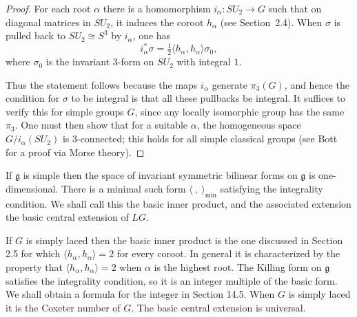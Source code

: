 \documentclass[12pt]{article}
\begin{document}
\begin{proof}
        For each root $\alpha$ there is a homomorphism $i_\alpha : SU_2 \to G$ such that on diagonal matrices in $SU_2$, it induces the coroot $h_\alpha$ (see Section~2.4). When $\sigma$ is pulled back to $SU_2 \cong S^3$ by $i_\alpha$, one has
        \[
            i_\alpha^*\sigma = \tfrac{1}{2}\langle h_\alpha, h_\alpha\rangle \sigma_0,
        \]
        where $\sigma_0$ is the invariant 3-form on $SU_2$ with integral $1$. 
        
        Thus the statement follows because the maps $i_\alpha$ generate $\pi_3(G)$, and hence the condition for $\sigma$ to be integral is that all these pullbacks be integral. It suffices to verify this for simple groups $G$, since any locally isomorphic group has the same $\pi_3$. One must then show that for a suitable $\alpha$, the homogeneous space $G/i_\alpha(SU_2)$ is 3-connected; this holds for all simple classical groups (see Bott~\cite{Bott-MorseTheory} for a proof via Morse theory).
    \end{proof}



    If $\mathfrak{g}$ is simple then the space of invariant symmetric bilinear forms on $\mathfrak{g}$ is one-dimensional. There is a minimal such form $\langle\ ,\ \rangle_{\mathrm{min}}$ satisfying the integrality condition. We shall call this the basic inner product, and the associated extension the basic central extension of $LG$. 

    If $G$ is simply laced then the basic inner product is the one discussed in Section 2.5 for which $\langle h_\alpha, h_\alpha\rangle = 2$ for every coroot. In general it is characterized by the property that $\langle h_\alpha, h_\alpha\rangle = 2$ when $\alpha$ is the highest root. The Killing form on $\mathfrak{g}$ satisfies the integrality condition, so it is an integer multiple of the basic form. We shall obtain a formula for the integer in Section 14.5. When $G$ is simply laced it is the Coxeter number of $G$. The basic central extension is universal.

\end{document}
